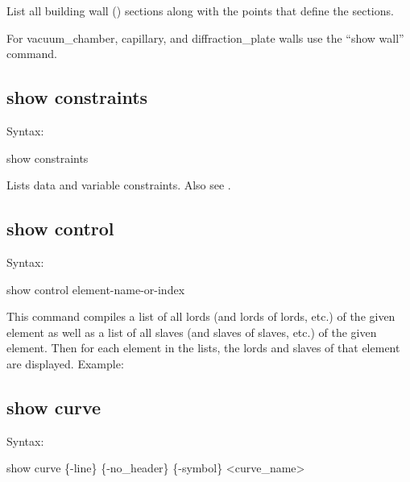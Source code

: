 {{{{{{{{List all building wall () sections along with the points that define
the sections.

For vacuum_chamber, capillary, and diffraction_plate walls use the ``show wall'' command.


\subsection{show constraints}
\label{s:show.constraints}

Syntax:
\begin{example}
  show constraints
\end{example}

Lists data and variable constraints. Also see .


\subsection{show control}
\label{s:show.control}

Syntax:
\begin{example}
  show control {element-name-or-index}
\end{example}

This command compiles a list of all lords (and lords of lords, etc.) of the given element as well as
a list of all slaves (and slaves of slaves, etc.) of the given element. Then for each element in
the lists, the lords and slaves of that element are displayed. Example:


\subsection{show curve}
\label{s:show.curve}

Syntax:
\begin{example}
  show curve \{-line\} \{-no_header\} \{-symbol\} <curve_name>
\end{example}


}}}}}}}}
